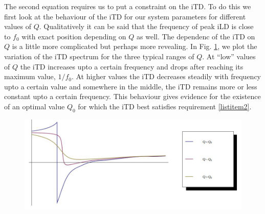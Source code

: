 The second equation requires us to put a constraint on the iTD. To do this we first look at the behaviour of the iTD for our system parameters for
different values of $Q$.
Qualitatively it can be said that the frequency of peak iLD is close to $f_0$ with exact position depending on $Q$ as well.
The dependenc of the iTD on $Q$ is a little more complicated but perhaps more revealing. In Fig. \ref{itdQdependence}, we plot the variation of the 
iTD spectrum for the three typical ranges of $Q$. At ``low'' values of $Q$ the iTD increases upto a certain frequency and drops
 after reaching its maximum value, $1/f_0$. At higher values the iTD decreases steadily with frequency upto a certain value and
 somewhere in the middle, the iTD remains more or less constant upto a certain frequency. This behaviour gives evidence for the existence of an optimal value $Q_0$ 
for which the iTD  best satisfies requirement \ref{listitem2}.

\begin{figure}[ht!]
\centering
  \includegraphics[width=.7\linewidth]{Diagrams/Plots/paramtest/allthree.jpeg}
  \caption[Dependence of iTD spectrum on Quality Factor]{}
  \label{itdQdependence}
\end{figure}

